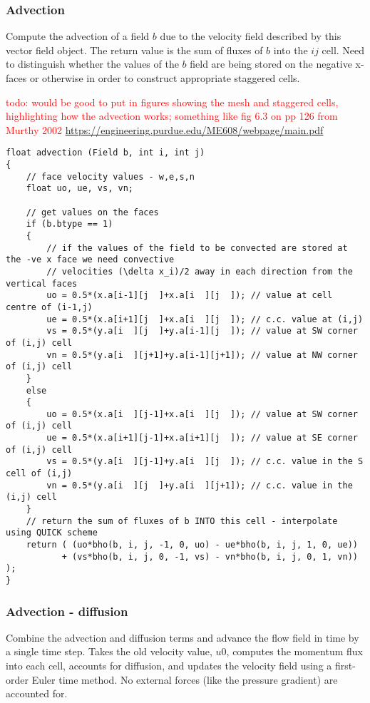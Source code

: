 \documentclass[notitlepage]{article}
\begin{document}
\subsubsection{Advection}

Compute the advection of a field $b$ due to the velocity field described by this vector field object.
The return value is the sum of fluxes of $b$ into the $ij$ cell. Need to distinguish whether the values
of the $b$ field are being stored on the negative x-faces or otherwise in order to construct appropriate
staggered cells.

\textcolor{red}{todo: would be good to put in figures showing the mesh and staggered cells, highlighting how
	the advection works; something like fig 6.3 on pp 126 from Murthy 2002 \url{https://engineering.purdue.edu/ME608/webpage/main.pdf}}

\begin{lstlisting}[style=myCpp]
float advection (Field b, int i, int j)
{
	// face velocity values - w,e,s,n
	float uo, ue, vs, vn;
	
	// get values on the faces
	if (b.btype == 1)
	{
		// if the values of the field to be convected are stored at the -ve x face we need convective
		// velocities (\delta x_i)/2 away in each direction from the vertical faces
		uo = 0.5*(x.a[i-1][j  ]+x.a[i  ][j  ]); // value at cell centre of (i-1,j)
		ue = 0.5*(x.a[i+1][j  ]+x.a[i  ][j  ]); // c.c. value at (i,j)
		vs = 0.5*(y.a[i  ][j  ]+y.a[i-1][j  ]); // value at SW corner of (i,j) cell
		vn = 0.5*(y.a[i  ][j+1]+y.a[i-1][j+1]); // value at NW corner of (i,j) cell
	}
	else
	{
		uo = 0.5*(x.a[i  ][j-1]+x.a[i  ][j  ]); // value at SW corner of (i,j) cell
		ue = 0.5*(x.a[i+1][j-1]+x.a[i+1][j  ]); // value at SE corner of (i,j) cell
		vs = 0.5*(y.a[i  ][j-1]+y.a[i  ][j  ]); // c.c. value in the S cell of (i,j)
		vn = 0.5*(y.a[i  ][j  ]+y.a[i  ][j+1]); // c.c. value in the (i,j) cell
	}
	// return the sum of fluxes of b INTO this cell - interpolate using QUICK scheme
	return ( (uo*bho(b, i, j, -1, 0, uo) - ue*bho(b, i, j, 1, 0, ue))
		   + (vs*bho(b, i, j, 0, -1, vs) - vn*bho(b, i, j, 0, 1, vn)) );
}
\end{lstlisting}

\subsubsection{Advection - diffusion}

Combine the advection and diffusion terms and advance the flow field in time by
a single time step.
Takes the old velocity value, $u0$, computes the momentum flux into each cell,
accounts for diffusion, and updates the velocity field using a first-order
Euler time method. No external forces (like the pressure gradient) are accounted for.
\end{document}
